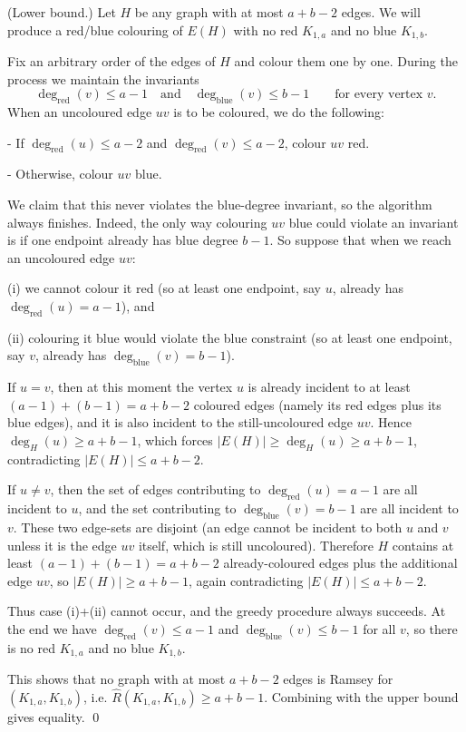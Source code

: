 (Lower bound.) Let $H$ be any graph with at most $a+b-2$ edges.
We will produce a red/blue colouring of $E(H)$ with no red $K_{1,a}$ and no blue $K_{1,b}$.

Fix an arbitrary order of the edges of $H$ and colour them one by one.
During the process we maintain the invariants
\[
\deg_{\text{red}}(v)\le a-1\quad\text{and}\quad \deg_{\text{blue}}(v)\le b-1\qquad\text{for every vertex }v.
\]
When an uncoloured edge $uv$ is to be coloured, we do the following:

- If $\deg_{\text{red}}(u)\le a-2$ and $\deg_{\text{red}}(v)\le a-2$, colour $uv$ red.

- Otherwise, colour $uv$ blue.

We claim that this never violates the blue-degree invariant, so the algorithm always finishes.
Indeed, the only way colouring $uv$ blue could violate an invariant is if one endpoint already has blue degree $b-1$.
So suppose that when we reach an uncoloured edge $uv$:

(i) we cannot colour it red (so at least one endpoint, say $u$, already has $\deg_{\text{red}}(u)=a-1$), and

(ii) colouring it blue would violate the blue constraint (so at least one endpoint, say $v$, already has $\deg_{\text{blue}}(v)=b-1$).

If $u=v$, then at this moment the vertex $u$ is already incident to at least $(a-1)+(b-1)=a+b-2$ coloured edges (namely its red edges plus its blue edges), and it is also incident to the still-uncoloured edge $uv$.
Hence $\deg_H(u)\ge a+b-1$, which forces $|E(H)|\ge \deg_H(u)\ge a+b-1$, contradicting $|E(H)|\le a+b-2$.

If $u\neq v$, then the set of edges contributing to $\deg_{\text{red}}(u)=a-1$ are all incident to $u$, and the set contributing to $\deg_{\text{blue}}(v)=b-1$ are all incident to $v$.
These two edge-sets are disjoint (an edge cannot be incident to both $u$ and $v$ unless it is the edge $uv$ itself, which is still uncoloured).
Therefore $H$ contains at least $(a-1)+(b-1)=a+b-2$ already-coloured edges plus the additional edge $uv$, so $|E(H)|\ge a+b-1$, again contradicting $|E(H)|\le a+b-2$.

Thus case (i)+(ii) cannot occur, and the greedy procedure always succeeds.
At the end we have $\deg_{\text{red}}(v)\le a-1$ and $\deg_{\text{blue}}(v)\le b-1$ for all $v$, so there is no red $K_{1,a}$ and no blue $K_{1,b}$.

This shows that no graph with at most $a+b-2$ edges is Ramsey for $(K_{1,a},K_{1,b})$, i.e. $\hat{R}(K_{1,a},K_{1,b})\ge a+b-1$.
Combining with the upper bound gives equality.
\qed


